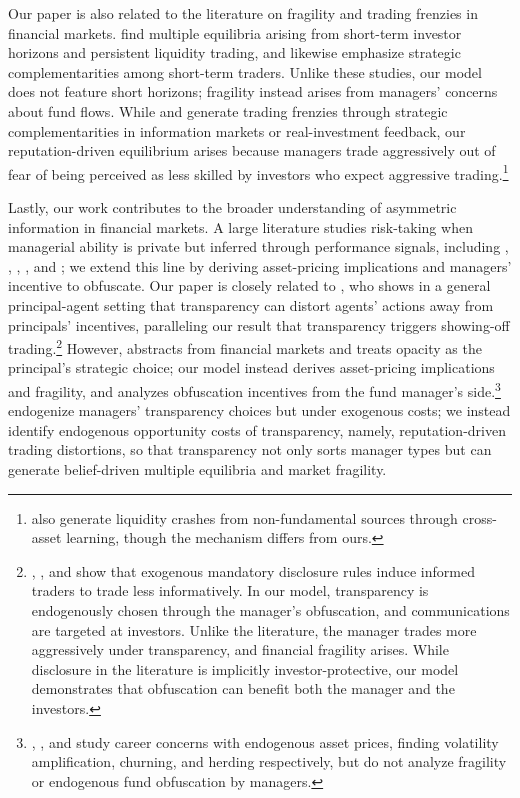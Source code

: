 Our paper is also related to the literature on fragility and trading frenzies in financial markets. \citet{cespa2015beauty} find multiple equilibria arising from short-term investor horizons and persistent liquidity trading, and \citet*{froot1992herd} likewise emphasize strategic complementarities among short-term traders. Unlike these studies, our model does not feature short horizons; fragility instead arises from managers' concerns about fund flows. While \citet{veldkamp2006media} and \citet*{goldstein2013trading} generate trading frenzies through strategic complementarities in information markets or real-investment feedback, our reputation-driven equilibrium arises because managers trade aggressively out of fear of being perceived as less skilled by investors who expect aggressive trading.\footnote{\citet{cespa2014illiquidity} also generate liquidity crashes from non-fundamental sources through cross-asset learning, though the mechanism differs from ours.} 

Lastly, our work contributes to the broader understanding of asymmetric information in financial markets. A large literature studies risk-taking when managerial ability is private but inferred through performance signals, including \citet{Huberman1993ontheincentives}, \citet{huddart1999reputation}, \citet{di2015fake}, \citet*{bijlsma2018competition}, and \citet*{malliaris2021reputation}; we extend this line by deriving asset-pricing implications and managers' incentive to obfuscate. Our paper is closely related to \citet{prat2005wrong}, who shows in a general principal-agent setting that transparency can distort agents' actions away from principals' incentives, paralleling our result that transparency triggers showing-off trading.\footnote{\citet{fishman1995mandatory}, \citet{john1997market}, and \citet*{huddart2003public} show that exogenous mandatory disclosure rules induce informed traders to trade less informatively. In our model, transparency is endogenously chosen through the manager's obfuscation, and communications are targeted at investors. Unlike the literature, the manager trades more aggressively under transparency, and financial fragility arises. While disclosure in the literature is implicitly investor-protective, our model demonstrates that obfuscation can benefit both the manager and the investors.}
 However, \citet{prat2005wrong} abstracts from financial markets and treats opacity as the principal's strategic choice; our model instead derives asset-pricing implications and fragility, and analyzes obfuscation incentives from the fund manager's side.\footnote{\citet{dasgupta2006financial}, \citet{dasgupta2008information}, and \citet{guerrieri2012fund} study career concerns with endogenous asset prices, finding volatility amplification, churning, and herding respectively, but do not analyze fragility or endogenous fund obfuscation by managers.} \citet{gervais2020transparency} endogenize managers' transparency choices but under exogenous costs; we instead identify endogenous opportunity costs of transparency, namely, reputation-driven trading distortions, so that transparency not only sorts manager types but can generate belief-driven multiple equilibria and market fragility.


